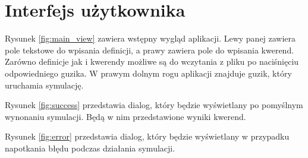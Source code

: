 \documentclass{article}
\begin{document}

\section{Interfejs użytkownika}

Rysunek \ref{fig:main_view} zawiera wstępny wygląd aplikacji. Lewy panej zawiera pole tekstowe do wpisania definicji, a prawy zawiera pole do wpisania kwerend. Zarówno definicje jak i kwerendy możliwe są do wczytania z pliku po naciśnięciu odpowiedniego guzika. W prawym dolnym rogu aplikacji znajduje guzik, który uruchamia symulację.

Rysunek \ref{fig:success} przedstawia dialog, który będzie wyświetlany po pomyślnym wynonaniu symulacji. Będą w nim przedstawione wyniki kwerend.

Rysunek \ref{fig:error} przedstawia dialog, który będzie wyświetlany w przypadku napotkania błędu podczas działania symulacji.
\end{document}
